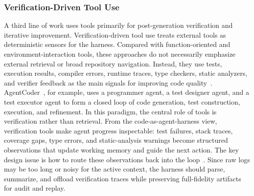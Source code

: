 \documentclass{llmxive}
\begin{document}
\subsubsection{Verification-Driven Tool Use}
A third line of work uses tools primarily for post-generation verification and iterative improvement. Verification-driven tool use treats external tools as deterministic sensors for the harness. Compared with function-oriented and environment-interaction tools, these approaches do not necessarily emphasize external retrieval or broad repository navigation. Instead, they use tests, execution results, compiler errors, runtime traces, type checkers, static analyzers, and verifier feedback as the main signals for improving code quality~\cite{miculicich2025veriguard,liu2026agents4plc,liu2026llm,jin2025reveal}. AgentCoder~\cite{huang2023agentcoder}, for example, uses a programmer agent, a test designer agent, and a test executor agent to form a closed loop of code generation, test construction, execution, and refinement. In this paradigm, the central role of tools is verification rather than retrieval. From the code-as-agent-harness view, verification tools make agent progress inspectable: test failures, stack traces, coverage gaps, type errors, and static-analysis warnings become structured observations that update working memory and guide the next action. The key design issue is how to route these observations back into the loop~\cite{miculicich2025veriguard}. Since raw logs may be too long or noisy for the active context, the harness should parse, summarize, and offload verification traces while preserving full-fidelity artifacts for audit and replay.
\end{document}
